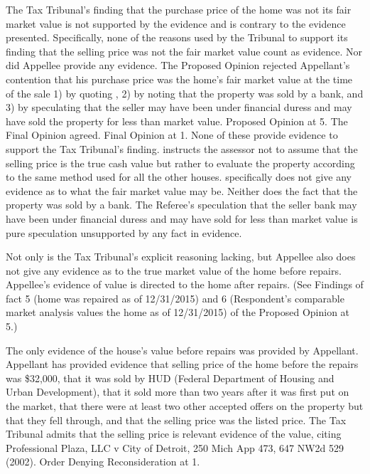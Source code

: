 \documentclass[12pt,\documentclassflag]{michiganCourtOfAppealsBrief}
\begin{document}
The Tax Tribunal's finding that the purchase price of the home was not its fair market value is not supported by the evidence and is contrary to the evidence presented. Specifically, none of the reasons used by the Tribunal to support its finding that the selling price was not the fair market value count as evidence. Nor did Appellee provide any evidence. The Proposed Opinion rejected Appellant's contention that his purchase price was the home's fair market value at the time of the sale 1) by quoting , 2) by noting that the property was sold by a bank, and 3) by speculating that the seller may have been under financial duress and may have sold the property for less than market value. Proposed Opinion at 5. The Final Opinion agreed. Final Opinion at 1. None of these provide evidence to support the Tax Tribunal's finding.  instructs the assessor not to assume that the selling price is the true cash value but rather to evaluate the property according to the same method used for all the other houses.  specifically does not give any evidence as to what the fair market value may be. Neither does the fact that the property was sold by a bank. The Referee's speculation that the seller bank may have been under financial duress and may have sold for less than market value is pure speculation unsupported by any fact in evidence. 

Not only is the Tax Tribunal's explicit reasoning lacking, but Appellee also does not give any evidence as to the true market value of the home before repairs. Appellee's evidence of value is directed to the home after repairs. (See Findings of fact 5 (home was repaired as of 12/31/2015) and 6 (Respondent's comparable market analysis values the home as of 12/31/2015) of the Proposed Opinion at 5.)

The only evidence of the house's value before repairs was provided by Appellant. Appellant has provided evidence that selling price of the home before the repairs was \$32,000, that it was sold by HUD (Federal Department of Housing and Urban Development), that it sold more than two years after it was first put on the market, that there were at least two other accepted offers on the property but that they fell through, and that the selling price was the listed price. The Tax Tribunal admits that the selling price is relevant evidence of the value, citing Professional Plaza, LLC v City of Detroit, 250 Mich App 473, 647 NW2d 529 (2002). Order Denying Reconsideration at 1. 
\end{document}
